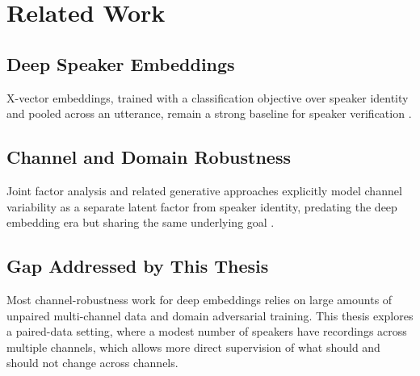 
\chapter{Related Work}
\label{ch:related}

\section{Deep Speaker Embeddings}
X-vector embeddings, trained with a classification objective over speaker
identity and pooled across an utterance, remain a strong baseline for
speaker verification \citep{snyder2018}.

\section{Channel and Domain Robustness}
Joint factor analysis and related generative approaches explicitly model
channel variability as a separate latent factor from speaker identity,
predating the deep embedding era but sharing the same underlying goal
\citep{kenny2010}.

\section{Gap Addressed by This Thesis}
Most channel-robustness work for deep embeddings relies on large amounts
of unpaired multi-channel data and domain adversarial training. This
thesis explores a paired-data setting, where a modest number of speakers
have recordings across multiple channels, which allows more direct
supervision of what should and should not change across channels.
